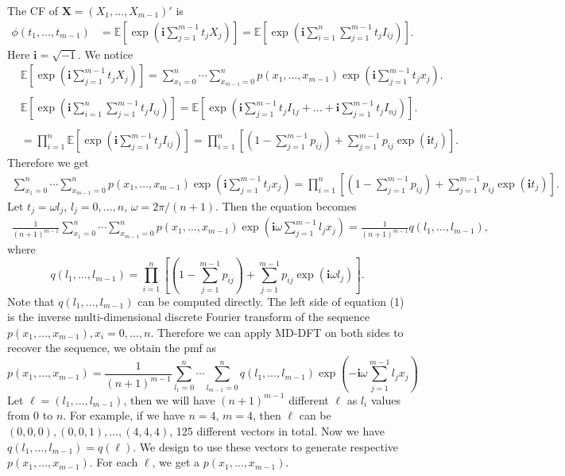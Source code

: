 \documentclass[12pt]{article}
\newcommand{\EE}{\mathbb{E}}
\newcommand{\Xmat}{\mathbf{X}}
\newcommand{\ivec}{{\boldsymbol{i}}}
\begin{document}
The CF of $\Xmat=(X_1, \dots, X_{m-1})'$ is
\begin{align*}
\phi(t_1, \dots, t_{m-1}) & = \EE\left[\exp\left(\ivec\sum_{j=1}^{m-1}t_jX_j\right)\right]=\EE\left[\exp\left(\ivec\sum_{i = 1}^n \sum_{j=1}^{m-1}t_j I_{ij}\right)\right].
\end{align*}
Here $\ivec=\sqrt{-1}$. We notice
\begin{equation*}
\begin{split}
  &\EE\left[\exp\left(\ivec\sum_{j=1}^{m-1}t_jX_j\right)\right] = \sum_{x_1 = 0}^{n}\cdots \sum_{x_{m-1} = 0}^n p(x_1,\ldots,x_{m-1})\exp\left(\ivec\sum_{j=1}^{m-1}t_jx_j\right).\\
  \\
  &\EE\left[\exp\left(\ivec\sum_{i = 1}^n \sum_{j=1}^{m-1}t_j I_{ij}\right)\right] = \EE\left[ \exp\left( \ivec\sum_{j=1}^{m-1} t_jI_{1j} + \dots + \ivec\sum_{j=1}^{m-1} t_jI_{nj}\right)\right].\\
  \\
  & = \prod_{i=1}^n \EE\left[ \exp\left( \ivec \sum_{j=1}^{m-1} t_j I_{ij}\right)\right] = \prod_{i=1}^n \left[(1 - \sum_{j=1}^{m-1}p_{ij})+\sum_{j=1}^{m-1}p_{ij}\exp(\ivec t_j)\right].
\end{split}
\end{equation*}
Therefore we get
\begin{align*}
\sum_{x_1 = 0}^{n}\cdots \sum_{x_{m-1} = 0}^n p(x_1,\ldots,x_{m-1})\exp\left(\ivec\sum_{j=1}^{m-1}t_jx_j\right)= \prod_{i=1}^{n}\left[(1 - \sum_{j=1}^{m-1}p_{ij})+\sum_{j=1}^{m-1}p_{ij}\exp(\ivec t_j)\right].
\end{align*}
Let $t_j = \omega l_j$, $l_j = 0, \ldots, n$, $\omega = 2\pi/(n+1)$. Then the equation becomes
\begin{align}
\frac{1}{(n+1)^{m-1}} \sum_{x_1 = 0}^{n}\cdots \sum_{x_{m-1} = 0}^n p(x_1,\ldots,x_{m-1}) \exp\left(\ivec\omega\sum_{j=1}^{m-1}l_j x_j\right)= \frac{1}{(n+1)^{m-1}} q(l_1, \ldots, l_{m-1}),
\end{align}
where
$$ q(l_1, \ldots, l_{m-1})=\prod_{i=1}^{n}\left[(1 - \sum_{j=1}^{m-1}p_{ij})+\sum_{j=1}^{m-1}p_{ij}\exp(\ivec \omega l_j)\right].$$	
Note that $q(l_1, \ldots, l_{m-1})$ can be computed directly. The left side of equation (1) is the inverse multi-dimensional discrete Fourier transform of the sequence $ p(x_1,\ldots,x_{m-1}), x_i = 0 , \dots, n$. Therefore we can apply MD-DFT on both sides to recover the sequence, we obtain the pmf as
\begin{equation}
p(x_1, \ldots, x_{m-1}) = \frac{1}{(n+1)^{m-1}}\sum_{l_1 = 0}^{n}\cdots \sum_{l_{m-1} = 0}^n q(l_1, \ldots, l_{m-1}) \exp\left(-\ivec\omega\sum_{j=1}^{m-1}l_j x_j\right)
\end{equation}
Let $\ell = (l_1,\dots,l_{m-1})$, then we will have $(n
+1)^{m-1}$ different $\ell$ as $l_i$ values from $0$ to $n$. For example, if we have $n=4$, $m=4$, then $\ell$ can be $(0, 0, 0), (0, 0, 1), \dots, (4, 4, 4)$, 125 different vectors in total. Now we have $q(l_1,\dots,l_{m-1}) = q(\ell)$. We design to use these vectors to generate respective $p(x_1,\dots,x_{m-1})$. For each $\ell$, we get a $p(x_1,\dots,x_{m-1})$.
\end{document}
